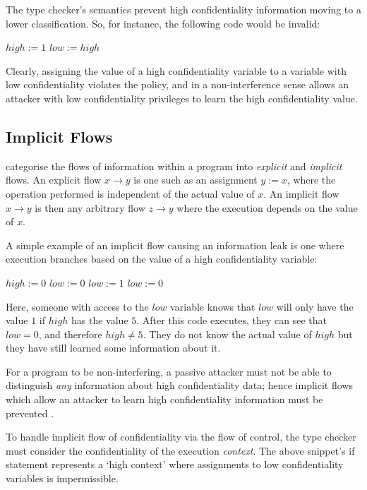 The type checker's semantics prevent high confidentiality information moving to a lower classification. So, for instance, the following code would be invalid:

\begin{algorithmic}
\State $ high := 1 $
\State $ low := high $
\end{algorithmic}

Clearly, assigning the value of a high confidentiality variable to a variable with low confidentiality violates the policy, and in a non-interference sense allows an attacker with low confidentiality privileges to learn the high confidentiality value.

\subsection{Implicit Flows}

\citeauthor{denning1977certification} \cite{denning1977certification} categorise the flows of information within a program into \textit{explicit} and \textit{implicit} flows. An explicit flow $ x \rightarrow y $ is one such as an assignment $ y := x $, where the operation performed is independent of the actual value of $ x $. An implicit flow $ x \rightarrow y $ is then any arbitrary flow $ z \rightarrow y $ where the execution depends on the value of $ x $. 

A simple example of an implicit flow causing an information leak is one where execution branches based on the value of a high confidentiality variable:

\begin{algorithmic}
	\State $ high := 0 $
	\State $ low := 0 $
		\State $ low := 1 $
	\Else
		\State $ low := 0 $
	\EndIf
\end{algorithmic}

Here, someone with access to the $ low $ variable knows that $ low $ will only have the value $ 1 $ if $ high $ has the value $ 5 $. After this code executes, they can see that $ low = 0 $, and therefore $ high \ne 5 $. They do not know the actual value of $ high $ but they have still learned some information about it.

For a program to be non-interfering, a passive attacker must not be able to distinguish \textit{any} information about high confidentiality data; hence implicit flows which allow an attacker to learn high confidentiality information must be prevented \cite{sabelfeld2003if}.


To handle implicit flow of confidentiality via the flow of control, the type checker must consider the confidentiality of the execution \textit{context}. The above snippet's if statement represents a `high context' where assignments to low confidentiality variables is impermissible.

